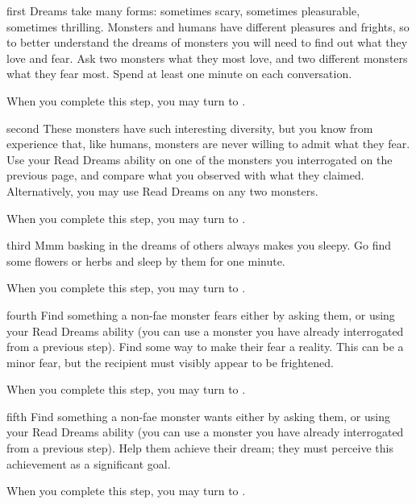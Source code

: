 \documentclass[notebook]{guildcamp2} %
\begin{document}
\startnotebook{\nDreams{}}

\begin{page}{first}
Dreams take many forms: sometimes scary, sometimes pleasurable, sometimes thrilling. Monsters and humans have different pleasures and frights, so to better understand the dreams of monsters you will need to find out what they love and fear. Ask two monsters what they most love, and two different monsters what they fear most. Spend at least one minute on each conversation.

When you complete this step, you may turn to .
\end{page}


\begin{page}{second}
These monsters have such interesting diversity, but you know from experience that, like humans, monsters are never willing to admit what they fear. Use your Read Dreams ability on one of the monsters you interrogated on the previous page, and compare what you observed with what they claimed. Alternatively, you may use Read Dreams on any two monsters.

When you complete this step, you may turn to .
\end{page}


\begin{page}{third}
Mmm basking in the dreams of others always makes you sleepy. Go find some flowers or herbs and sleep by them for one minute.

When you complete this step, you may turn to .
\end{page}


\begin{page}{fourth}
Find something a non-fae monster fears either by asking them, or using your Read Dreams ability (you can use a monster you have already interrogated from a previous step). Find some way to make their fear a reality. This can be a minor fear, but the recipient must visibly appear to be frightened.

When you complete this step, you may turn to .
\end{page}


\begin{page}{fifth}
Find something a non-fae monster wants either by asking them, or using your Read Dreams ability (you can use a monster you have already interrogated from a previous step). Help them achieve their dream; they must perceive this achievement as a significant goal.

When you complete this step, you may turn to .
\end{page}
\end{document}
